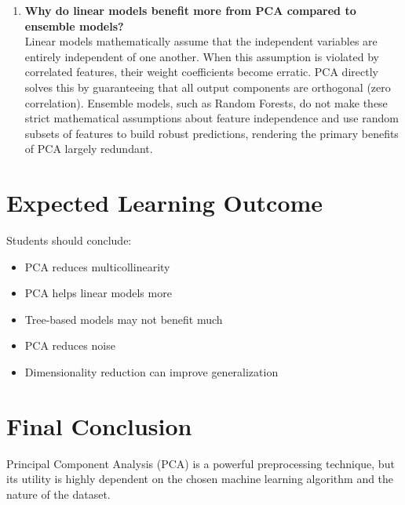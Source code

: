 \documentclass[11pt]{article}
\begin{document}
\begin{enumerate}
\item \textbf{Why do linear models benefit more from PCA compared to ensemble models?} \\
Linear models mathematically assume that the independent variables are entirely independent of one another. When this assumption is violated by correlated features, their weight coefficients become erratic. PCA directly solves this by guaranteeing that all output components are orthogonal (zero correlation). Ensemble models, such as Random Forests, do not make these strict mathematical assumptions about feature independence and use random subsets of features to build robust predictions, rendering the primary benefits of PCA largely redundant.

\end{enumerate}

\section*{Expected Learning Outcome}

Students should conclude:

\begin{itemize}
    \item PCA reduces multicollinearity
    \item PCA helps linear models more
    \item Tree-based models may not benefit much
    \item PCA reduces noise
    \item Dimensionality reduction can improve generalization
\end{itemize}

\section*{Final Conclusion}

Principal Component Analysis (PCA) is a powerful preprocessing technique, but its utility is highly dependent on the chosen machine learning algorithm and the nature of the dataset.
\end{document}
